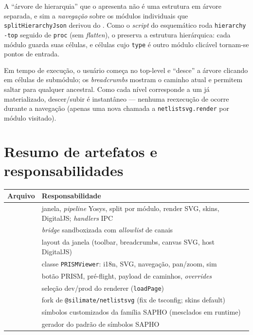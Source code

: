 A \enquote{árvore de hierarquia} que o  apresenta não é uma estrutura
em árvore separada, e sim a \emph{navegação} sobre os módulos individuais que
\lstinline|splitHierarchyJson| derivou do . Como o
\emph{script} do esquemático roda \lstinline|hierarchy -top| seguido de
\lstinline|proc| (sem \emph{flatten}), o  preserva a
estrutura hierárquica: cada módulo guarda suas células, e células cujo
\lstinline|type| é outro módulo clicável tornam-se pontos de entrada.

Em tempo de execução, o usuário começa no top-level e \enquote{desce} a árvore
clicando em células de submódulo; os \emph{breadcrumbs} mostram o caminho atual e
permitem saltar para qualquer ancestral. Como cada nível corresponde a um
 já materializado, descer/subir é instantâneo --- nenhuma
reexecução de  ocorre durante a navegação (apenas uma nova chamada a
\lstinline|netlistsvg.render| por módulo visitado).

\section{Resumo de artefatos e responsabilidades}

\begin{tabularx}{\linewidth}{Y Z}
\toprule
\textbf{Arquivo} & \textbf{Responsabilidade} \\
\midrule
{} & janela, \emph{pipeline} Yosys, split por módulo, render SVG, skins, DigitalJS; \emph{handlers} IPC \\
 & \emph{bridge} sandboxizada com \emph{allowlist} de canais \\
 & layout da janela (toolbar, breadcrumbs, canvas SVG, host DigitalJS) \\
 & classe \lstinline|PRISMViewer|: i18n, SVG, navegação, pan/zoom, sim \\
 & botão PRISM, pré-flight, payload de caminhos, \emph{overrides} \\
 & seleção dev/prod do renderer (\lstinline|loadPage|) \\
 & fork de \lstinline|@silimate/netlistsvg| (fix de tsconfig; skins default) \\
 & símbolos customizados da família SAPHO (mesclados em runtime) \\
 & gerador do padrão de símbolos SAPHO \\
\bottomrule
\end{tabularx}

